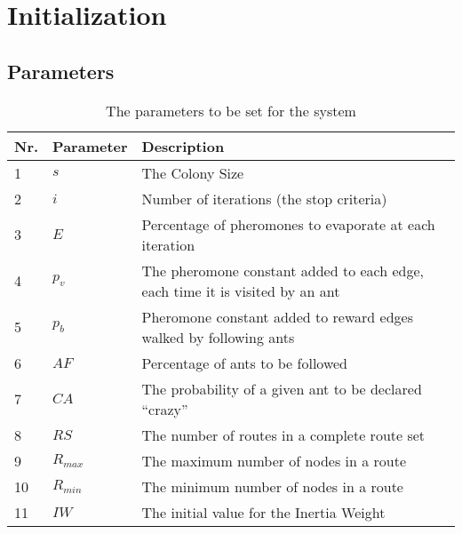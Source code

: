 \section{Initialization}
\label{sec:algoInitialization}
\subsection{Parameters}

\begin{table}[H]
    \centering
	\begin{tabular}{|l|l|m{9cm}|}
    	\hline
    	Nr. & \textbf{Parameter} & \textbf{Description} \\
    	\hline
    	1 & $s$ & The Colony Size \\
        
    	2 & $i$ & Number of iterations (the stop criteria) \\

    	3 & $E$ & Percentage of pheromones to evaporate at each iteration \\

    	4 & $p_v$ & The pheromone constant added to each edge, each time it is visited by an ant \\
        
        5 & $p_b$ & Pheromone constant added to reward edges walked by following ants \\
   		
   		6 & $AF$ & Percentage of ants to be followed \\

   		7 & $CA$ & The probability of a given ant to be declared ``crazy'' \\
        
    	8 & $RS$ & The number of routes in a complete route set \\
        
    	9 & $R_{max}$ & The maximum number of nodes in a route \\

        10 & $R_{min}$ & The minimum number of nodes in a route \\

        11 & $IW$ & The initial value for the Inertia Weight \\
   	    \hline
    \end{tabular}
    \caption {The parameters to be set for the system}
    \label{table:parametersToBeSet}
\end{table}


